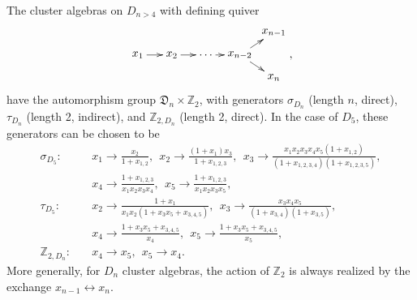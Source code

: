 \documentclass[12pt]{article}
\begin{document}
The cluster algebras on $D_{n>4}$ with defining quiver
\begin{equation}
    \begin{gathered}
    \begin{xy} 0;<1pt,0pt>:<0pt,-1pt>::
      (0,20) *+{x_1} ="1",
      (30,20) *+{x_2} ="2",
      (60,20) *+{\ldots} ="3",
      (90,20) *+{x_{n-2}} ="4",
      (120,0) *+{x_{n-1}} ="5",
      (120,40) *+{x_{n}} ="6",
      "1", {\ar"2"},
      "2", {\ar"3"},
      "3", {\ar"4"},
      "4", {\ar"5"},
      "4", {\ar"6"},
    \end{xy}
    \end{gathered},
\end{equation}
have the automorphism group ${\mathfrak D}_n \times \mathbb{Z}_2$, with generators $\sigma_{D_n}$ (length $n$, direct), $\tau_{D_n}$ (length 2, indirect), and $\mathbb{Z}_{2,D_n}$ (length 2, direct). In the case of $D_5$, these generators can be chosen to be
\vspace{.1cm}
\begin{align}
  \sigma_{D_5}:\quad 
    &x_1\to \frac{x_2}{1+x_{1,2}},~~
    x_2\to \frac{(1+x_1) x_3}{1+x_{1,2,3}},~~
    x_3\to \frac{x_1 x_2 x_3 x_4 x_5 (1+x_{1,2})}{(1+x_{1,2,3,4}) (1+x_{1,2,3,5})}, \nonumber \\
    &x_4\to \frac{1+x_{1,2,3}}{x_1 x_2 x_3 x_4},~~
    x_5\to \frac{1+x_{1,2,3}}{x_1 x_2 x_3 x_5}, \nonumber \\[2ex]
  \tau_{D_5}:\quad 
    &x_2\to \frac{1+x_1}{x_1 x_2 (1+x_3 x_5+x_{3,4,5})},~~
    x_3\to \frac{x_3 x_4 x_5}{(1+x_{3,4}) (1+x_{3,5})},\\
    &x_4\to \frac{1+x_3 x_5+x_{3,4,5}}{x_4},~~
    x_5\to \frac{1+x_3 x_5+x_{3,4,5}}{x_5}, \nonumber \\[2ex]
    \mathbb{Z}_{2,D_n}:\quad &x_4 \to x_5,~~ x_5 \to x_4. \nonumber
\end{align}
More generally, for $D_n$ cluster algebras, the action of $\mathbb{Z}_2$ is always realized by the exchange $x_{n-1} \leftrightarrow x_n$. 
\end{document}
